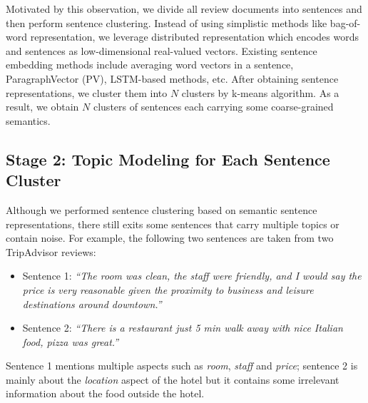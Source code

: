 Motivated by this observation, we divide all review documents into sentences and then perform sentence clustering.  
Instead of using simplistic methods like bag-of-word representation, 
we leverage distributed representation which encodes words and sentences as low-dimensional real-valued vectors.
Existing sentence embedding methods include averaging word vectors in a sentence, ParagraphVector (PV)\cite{le2014distributed}, LSTM-based methods\cite{hochreiter1997long}, etc.
After obtaining sentence representations,
we cluster them into $N$ clusters by k-means algorithm\cite{kmeans}.
As a result, we obtain $N$ clusters of sentences each carrying
some coarse-grained semantics.

\subsection{Stage 2: Topic Modeling for Each Sentence Cluster}

Although we performed sentence clustering based on 
semantic sentence representations, there still exits some 
sentences that carry multiple topics or contain noise.
For example, the following two sentences are taken from two 
TripAdvisor reviews:
\begin{itemize}
	\item Sentence 1: \textit{``The room was clean, the staff were 
friendly, and I would say the price is very reasonable given the 
proximity to business and leisure destinations around downtown.''}
	
	\item Sentence 2: \textit{``There is a restaurant just 5 min 
walk away with nice Italian food, pizza was great.''}
\end{itemize}
Sentence 1 mentions multiple aspects such as {\em room}, {\em staff} and {\em price};
sentence 2 is mainly about the {\em location} aspect of the hotel
but it contains some irrelevant information  about the food outside
the hotel.
 
